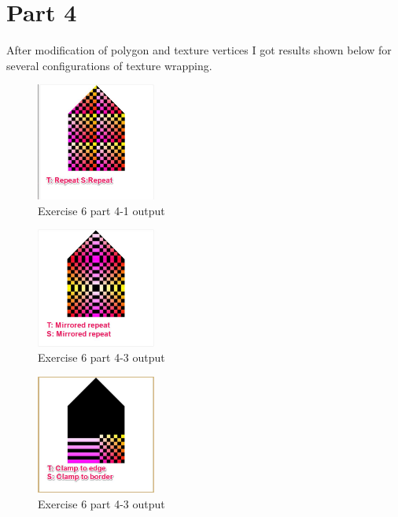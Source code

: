\section{Part 4}
After modification of polygon and texture vertices I got results shown below for
several configurations of texture wrapping.

\begin{figure}[ht!]
	\begin{center}
		\includegraphics[width=0.35\textwidth]{figures/exercise_6_part_5_1}
	\end{center}
	\vspace{-4.5ex}\caption{Exercise 6 part 4-1 output}
	\label{fig:exercise_6_part_5_1} 
\end{figure}
\begin{figure}[ht!]
	\begin{center}
		\includegraphics[width=0.35\textwidth]{figures/exercise_6_part_5_2}
	\end{center}
	\vspace{-4.5ex}\caption{Exercise 6 part 4-3 output}
	\label{fig:exercise_6_part_5_3} 
\end{figure}
\begin{figure}[ht!]
	\begin{center}
		\includegraphics[width=0.35\textwidth]{figures/exercise_6_part_5_3}
	\end{center}
	\vspace{-4.5ex}\caption{Exercise 6 part 4-3 output}
	\label{fig:exercise_6_part_5_3} 
\end{figure}


